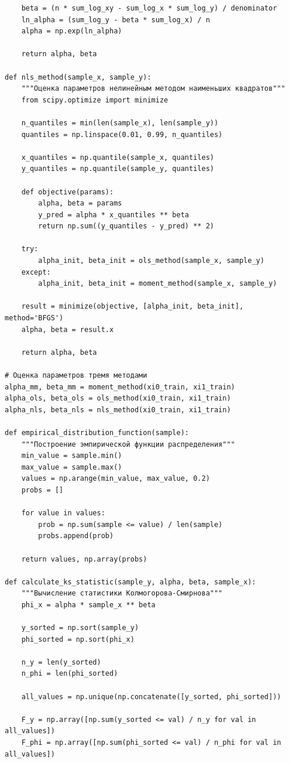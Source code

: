 \documentclass[a4paper, 14pt]{extarticle}
\begin{document}
\begin{longlisting}
\begin{verbatim}
    beta = (n * sum_log_xy - sum_log_x * sum_log_y) / denominator
    ln_alpha = (sum_log_y - beta * sum_log_x) / n
    alpha = np.exp(ln_alpha)
    
    return alpha, beta

def nls_method(sample_x, sample_y):
    """Оценка параметров нелинейным методом наименьших квадратов"""
    from scipy.optimize import minimize
    
    n_quantiles = min(len(sample_x), len(sample_y))
    quantiles = np.linspace(0.01, 0.99, n_quantiles)
    
    x_quantiles = np.quantile(sample_x, quantiles)
    y_quantiles = np.quantile(sample_y, quantiles)
    
    def objective(params):
        alpha, beta = params
        y_pred = alpha * x_quantiles ** beta
        return np.sum((y_quantiles - y_pred) ** 2)
    
    try:
        alpha_init, beta_init = ols_method(sample_x, sample_y)
    except:
        alpha_init, beta_init = moment_method(sample_x, sample_y)
    
    result = minimize(objective, [alpha_init, beta_init], method='BFGS')
    alpha, beta = result.x
    
    return alpha, beta

# Оценка параметров тремя методами
alpha_mm, beta_mm = moment_method(xi0_train, xi1_train)
alpha_ols, beta_ols = ols_method(xi0_train, xi1_train)
alpha_nls, beta_nls = nls_method(xi0_train, xi1_train)

def empirical_distribution_function(sample):
    """Построение эмпирической функции распределения"""
    min_value = sample.min()
    max_value = sample.max()
    values = np.arange(min_value, max_value, 0.2)
    probs = []
    
    for value in values:
        prob = np.sum(sample <= value) / len(sample)
        probs.append(prob)
    
    return values, np.array(probs)

def calculate_ks_statistic(sample_y, alpha, beta, sample_x):
    """Вычисление статистики Колмогорова-Смирнова"""
    phi_x = alpha * sample_x ** beta
    
    y_sorted = np.sort(sample_y)
    phi_sorted = np.sort(phi_x)
    
    n_y = len(y_sorted)
    n_phi = len(phi_sorted)
    
    all_values = np.unique(np.concatenate([y_sorted, phi_sorted]))
    
    F_y = np.array([np.sum(y_sorted <= val) / n_y for val in all_values])
    F_phi = np.array([np.sum(phi_sorted <= val) / n_phi for val in all_values])
    

\end{verbatim}
\end{longlisting}
\end{document}
